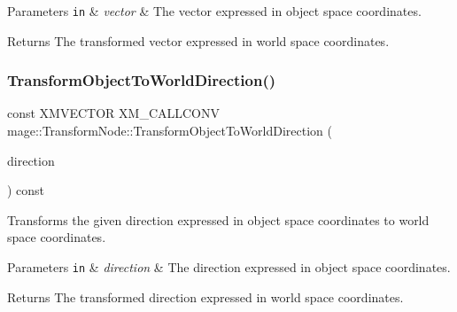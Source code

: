 \begin{DoxyParams}[1]{Parameters}
\mbox{\tt in}  & {\em vector} & The vector expressed in object space coordinates. \\
\hline
\end{DoxyParams}
\begin{DoxyReturn}{Returns}
The transformed vector expressed in world space coordinates. 
\end{DoxyReturn}
\hypertarget{classmage_1_1_transform_node_aacbb3c43db6a7b67170654e1ffc70892}{}\label{classmage_1_1_transform_node_aacbb3c43db6a7b67170654e1ffc70892} 
\subsubsection{\texorpdfstring{Transform\+Object\+To\+World\+Direction()}{TransformObjectToWorldDirection()}}
{\footnotesize\ttfamily const X\+M\+V\+E\+C\+T\+OR X\+M\+\_\+\+C\+A\+L\+L\+C\+O\+NV mage\+::\+Transform\+Node\+::\+Transform\+Object\+To\+World\+Direction (\begin{DoxyParamCaption}\item[{F\+X\+M\+V\+E\+C\+T\+OR}]{direction }\end{DoxyParamCaption}) const\hspace{0.3cm}{\ttfamily [noexcept]}}

Transforms the given direction expressed in object space coordinates to world space coordinates.


\begin{DoxyParams}[1]{Parameters}
\mbox{\tt in}  & {\em direction} & The direction expressed in object space coordinates. \\
\hline
\end{DoxyParams}
\begin{DoxyReturn}{Returns}
The transformed direction expressed in world space coordinates. 
\end{DoxyReturn}
\hypertarget{classmage_1_1_transform_node_a0cd8cd0683c141f2632d96bb3c155614}{}\label{classmage_1_1_transform_node_a0cd8cd0683c141f2632d96bb3c155614} 
